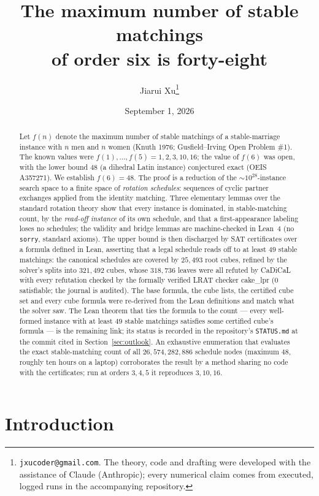 \documentclass[11pt]{article}
\title{The maximum number of stable matchings\\ of order six is forty-eight}
\author{Jiarui Xu\thanks{\texttt{jxucoder@gmail.com}. The theory, code and drafting were developed with
the assistance of Claude (Anthropic); every numerical claim comes from executed, logged runs in the
accompanying repository.}}
\date{September 1, 2026}
\begin{document}
\maketitle

\begin{abstract}
Let $f(n)$ denote the maximum number of stable matchings of a stable-marriage instance with $n$ men
and $n$ women (Knuth 1976; Gusfield--Irving Open Problem \#1). The known values were
$f(1),\dots,f(5)=1,2,3,10,16$; the value of $f(6)$ was open, with the lower bound $48$ (a dihedral
Latin instance) conjectured exact (OEIS A357271). We establish $f(6)=48$. The proof is a reduction
of the $\sim\!10^{28}$-instance search space to a finite space of \emph{rotation schedules}:
sequences of cyclic partner exchanges applied from the identity matching. Three elementary lemmas
over the standard rotation theory show that every instance is dominated, in stable-matching count,
by the \emph{read-off instance} of its own schedule, and that a first-appearance labeling loses no
schedules; the validity and bridge lemmas are machine-checked in Lean~4 (no \texttt{sorry},
standard axioms). The upper bound is then discharged by SAT certificates over a formula defined in
Lean, asserting that a legal schedule reads off to at least $49$ stable matchings: the canonical
schedules are covered by $25{,}493$ root cubes, refined by the solver's splits into $321{,}492$
cubes, whose $318{,}736$ leaves were all refuted by CaDiCaL with every refutation checked by the
formally verified LRAT checker cake\_lpr ($0$ satisfiable; the journal is audited). The base
formula, the cube lists, the certified cube set and every cube formula were re-derived from the
Lean definitions and match what the solver saw. The Lean theorem that ties the formula to the
count --- every well-formed instance with at least $49$ stable matchings satisfies some certified
cube's formula --- is the remaining link; its status is recorded in the repository's
\texttt{STATUS.md} at the commit cited in Section~\ref{sec:outlook}.
An exhaustive enumeration that evaluates the exact stable-matching count of all
$26{,}574{,}282{,}886$ schedule nodes (maximum $48$, roughly ten hours on a laptop) corroborates the
result by a method sharing no code with the certificates; run at orders $3,4,5$ it reproduces
$3,10,16$.
\end{abstract}

\section{Introduction}
\end{document}
